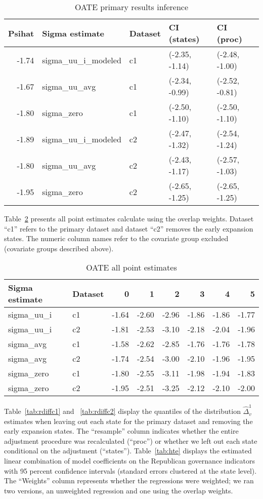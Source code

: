 \begin{table}[ht]
\centering
\caption{OATE primary results inference}
\label{tab:oateconfint}
\begin{tabular}{rllll}
  \hline
Psihat & Sigma estimate & Dataset & CI (states) & CI (proc) \\ 
  \hline
-1.74 & sigma\_uu\_i\_modeled & c1 & (-2.35, -1.14) & (-2.48, -1.00) \\ 
  -1.67 & sigma\_uu\_avg & c1 & (-2.34, -0.99) & (-2.52, -0.81) \\ 
  -1.80 & sigma\_zero & c1 & (-2.50, -1.10) & (-2.50, -1.10) \\ 
  -1.89 & sigma\_uu\_i\_modeled & c2 & (-2.47, -1.32) & (-2.54, -1.24) \\ 
  -1.80 & sigma\_uu\_avg & c2 & (-2.43, -1.17) & (-2.57, -1.03) \\ 
  -1.95 & sigma\_zero & c2 & (-2.65, -1.25) & (-2.65, -1.25) \\ 
   \hline
\end{tabular}
\end{table}

Table~\ref{tab:oatesensitive} presents all point estimates calculate using the overlap weights. Dataset ``c1'' refers to the primary dataset and dataset ``c2'' removes the early expansion states. The numeric column names refer to the covariate group excluded (covariate groups described above).

\begin{table}[ht]
\centering
\caption{OATE all point estimates}
\label{tab:oatesensitive}
\begin{tabular}{llrrrrrr}
  \hline
Sigma estimate & Dataset & 0 & 1 & 2 & 3 & 4 & 5 \\ 
  \hline
sigma\_uu\_i & c1 & -1.64 & -2.60 & -2.96 & -1.86 & -1.86 & -1.77 \\ 
  sigma\_uu\_i & c2 & -1.81 & -2.53 & -3.10 & -2.18 & -2.04 & -1.96 \\ 
  sigma\_avg & c1 & -1.58 & -2.62 & -2.85 & -1.76 & -1.76 & -1.78 \\ 
  sigma\_avg & c2 & -1.74 & -2.54 & -3.00 & -2.10 & -1.96 & -1.95 \\ 
  sigma\_zero & c1 & -1.80 & -2.55 & -3.11 & -1.98 & -1.94 & -1.83 \\ 
  sigma\_zero & c2 & -1.95 & -2.51 & -3.25 & -2.12 & -2.10 & -2.00 \\ 
   \hline
\end{tabular}
\end{table}

Table~\ref{tab:rdiffc1} and ~\ref{tab:rdiffc2} display the quantiles of the distribution $\hat{\Delta}_v^1$ estimates when leaving out each state for the primary dataset and removing the early expansion states. The ``resample'' column indicates whether the entire adjustment procedure was recalculated (``proc'') or whether we left out each state conditional on the adjustment (``states''). Table~\ref{tab:hte} displays the estimated linear combination of model coefficients on the Republican governance indicators with 95 percent confidence intervals (standard errors clustered at the state level). The ``Weights'' column represents whether the regressions were weighted; we ran two versions, an unweighted regression and one using the overlap weights.


